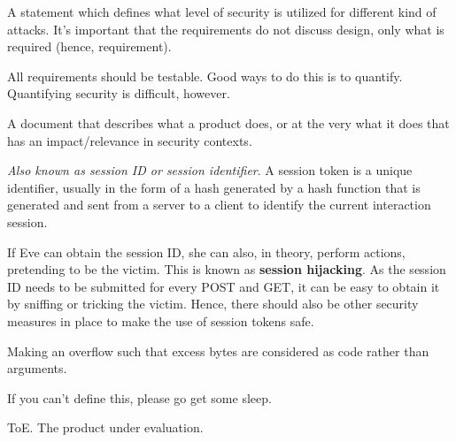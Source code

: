 \begin{definition}
	A statement which defines what level of security is utilized
	for different kind of attacks.
	It's important that the requirements do not discuss design,
	only what is required (hence, requirement).

	All requirements should be testable. Good ways to do this is 
	to quantify. Quantifying security is difficult, however.
\end{definition}

\begin{definition}
	A document that describes what a product does, 
	or at the very what it does that has an impact/relevance in security contexts.
\end{definition}

\begin{definition}\label{sessiontoken}
	\textit{Also known as session ID or session identifier}. 
	A session token is a unique identifier, usually in the form of a hash
	generated by a hash function that is generated and sent from a server to a 
	client to identify the current interaction session.	
	
	If Eve can obtain the session ID, she can also, in theory, perform 
	actions, pretending to be the victim. This is known as \textbf{session hijacking}.
	As the session ID needs to be submitted for every POST and GET, it can
	be easy to obtain it by sniffing or tricking the victim. Hence, there
	should also be other security measures in place to make the use of session
	tokens safe.
\end{definition}


\begin{definition}
	Making an overflow such that excess bytes are considered as code 
	rather than arguments.
\end{definition}

\begin{definition}
\end{definition}


\begin{definition}
	If you can't define this, please go get some sleep.
\end{definition}

\begin{definition}{ToE.}
	The product under evaluation.
\end{definition}

